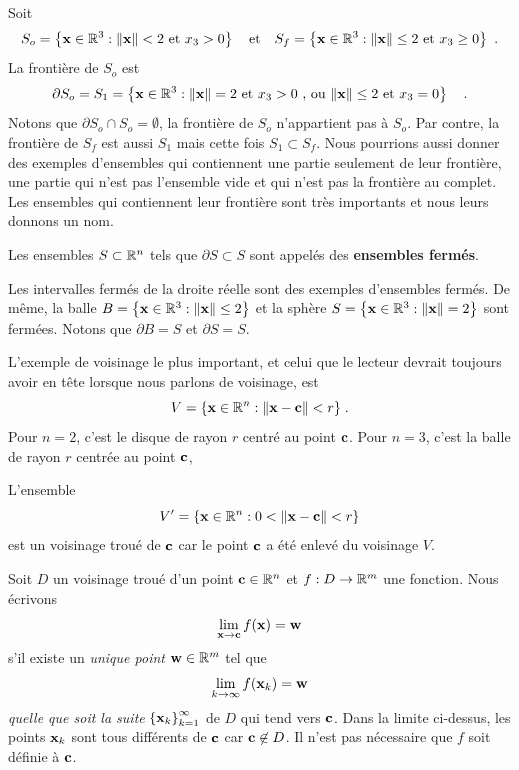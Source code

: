 {\begin{egg}[\theory]
Soit
\[
S_o = \left\{ \mathbf{x} \in \mathbb{R}^3 : \| \mathbf{x} \| < 2 \ \text{et} \
x_3> 0 \right\}
\quad \text{et} \quad
S_f = \left\{ \mathbf{x} \in \mathbb{R}^3 : \| \mathbf{x} \| \leq 2 \ \text{et}
\ x_3 \geq 0 \right\} \ .
\]
La frontière de $S_o$ est
\[
\partial S_o = S_1 = \left\{ \mathbf{x} \in \mathbb{R}^3 : \| \mathbf{x} \| = 2
\ \text{et} \ x_3 >0 \ \text{, ou}\ \|\mathbf{x}\| \leq 2
\ \text{et} \ x_3=0 \right\} \quad  .
\]
Notons que $\partial S_o \cap S_o = \emptyset$, la frontière de $S_o$
n'appartient pas à $S_o$.  Par contre, la frontière de $S_f$ est aussi
$S_1$ mais cette fois $S_1 \subset S_f$.  Nous pourrions aussi donner des
exemples d'ensembles qui contiennent une partie seulement de leur
frontière, une partie qui n'est pas l'ensemble vide et qui n'est pas
la frontière au complet.  Les ensembles qui contiennent leur frontière
sont très importants et nous leurs donnons un nom.
\end{egg}

\begin{focus}[\theory]{\dfn}
Les ensembles $S \subset \mathbb{R}^n$ tels que $\partial S \subset S$ sont
appelés des {\bfseries ensembles fermés}\index{Ensemble fermé}.
\end{focus}

\begin{rmk}[\theory]
Les intervalles fermés de la droite réelle sont des exemples
d'ensembles fermés.  De même, la balle
$B = \left\{ \mathbf{x} \in \mathbb{R}^3 : \|\mathbf{x}\|\leq 2 \right\}$ et la
sphère $S = \left\{ \mathbf{x} \in \mathbb{R}^3 : \|\mathbf{x}\| =  2 \right\}$
sont fermées.  Notons que $\partial B = S$ et $\partial S = S$.
\end{rmk}

\begin{egg}
L'exemple de voisinage le plus important, et celui que le lecteur
devrait toujours avoir en tête lorsque nous parlons de voisinage, est
\[
V = \{ \mathbf{x} \in \mathbb{R}^n : \|\mathbf{x} - \mathbf{c}\| < r \} \; .
\]
Pour $n=2$, c'est le disque de rayon $r$ centré au point $\mathbf{c}$.
Pour $n=3$, c'est la balle de rayon $r$ centrée au point $\mathbf{c}$,

L'ensemble
\[
V' = \{ \mathbf{x} \in \mathbb{R}^n : 0< \|\mathbf{x} - \mathbf{c}\| < r \}
\]
est un voisinage troué de $\mathbf{c}$ car le point $\mathbf{c}$ a été
enlevé du voisinage $V$. 
\end{egg}

\begin{focus}{\dfn} 
Soit $D$ un voisinage troué d'un point $\mathbf{c} \in \mathbb{R}^n$ et
$f:D\rightarrow \mathbb{R}^m$ une fonction.  Nous écrivons
\[
\lim_{\mathbf{x}\rightarrow \mathbf{c}} f(\mathbf{x}) = \mathbf{w}
\]
s'il existe un {\em unique point} $\mathbf{w} \in \mathbb{R}^m$ tel que
\[
\lim_{k\rightarrow \infty} f(\mathbf{x}_k) = \mathbf{w}
\]
{\em quelle que soit la suite} 
$\displaystyle \left\{\mathbf{x}_k\right\}_{k=1}^\infty$ de $D$ qui tend
vers $\mathbf{c}$.  Dans la limite ci-dessus, les points $\mathbf{x}_k$ sont
tous différents de $\mathbf{c}$ car $\mathbf{c}\not\in D$.  Il
n'est pas nécessaire que $f$ soit définie à $\mathbf{c}$.


\end{focus}}

